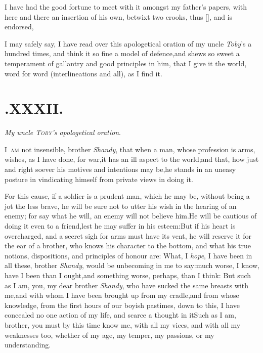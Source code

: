 \documentclass{article}
\begin{document}
I have had the good fortune to meet with it amongst my
father’s papers, with here and there an insertion of his own,
betwixt two crooks, thus [\quad \quad ], and is endorsed,

\newpage
\noindent
{}

\noindent
I may safely say, I have read over this apologetical oration of
my uncle \textit{Toby}’s a hundred times, and think it so fine
a model of defence,\tsk and shews so sweet a temperament of
gallantry and good principles in him, that I give it the world,
word for word (interlineations and all), as I find it.

\section{.\enspace XXXII.}
\centerline{\textit{My  uncle {\normalshape \textsc{Toby}}’s apologetical  oration}.}

\lettrine{I}{\ am} not insensible, brother \textit{Shandy}, that when a man, whose
profession is arms, wishes, as I have done, for war,\tsk it has an ill aspect to the
world;\tsh and that, how just and right soever his motives and intentions may
be,\tsk he stands in an uneasy posture in vindicating himself from private views in
doing it.

\newpage
For this cause, if a soldier is a prudent man, which he may be,
without being a jot the less brave, he will be sure not to utter
his wish in the hearing of an enemy; for say what he will, an enemy
will not believe him.\tsh He will be cautious of doing it
even to a friend,\tsk lest he may suffer in his
esteem:\tsh But if his heart is overcharged, and a secret
sigh for arms must have its vent, he will reserve it for the ear of
a brother, who knows his character to the bottom, and what his true
notions, dispositions, and principles of honour are: What, I \textit{hope}, I
have been in all these, brother \textit{Shandy}, would be unbecoming
in me to say:\tsh much worse, I know, have I been than I
ought,\tsk and something worse, perhaps, than I think: But such
as I am, you, my dear brother \textit{Shandy}, who have sucked the
same breasts with me,\tsk and with whom I have been\pb
brought up from my cradle,\tsk and from whose knowledge, from the first hours of our
boyish pastimes, down to this, I have concealed no one action of my life, and scarce
a thought in it\tsh Such as I am, brother, you must by this time know me, with all
my vices, and with all my weaknesses too, whether of my age, my temper, my passions,
or my understanding.
\end{document}
